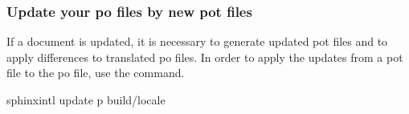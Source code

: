\documentclass[letterpaper,10pt,english]{sphinxmanual}
\begin{document}
\subsubsection{Update your po files by new pot files}
\label{\detokenize{usage/advanced/intl:update-your-po-files-by-new-pot-files}}
If a document is updated, it is necessary to generate updated pot files and to
apply differences to translated po files.  In order to apply the updates from a
pot file to the po file, use the  command.

\begin{sphinxVerbatim}[commandchars=\\\{\}]
 sphinx\PYGZhy{}intl update \PYGZhy{}p \PYGZus{}build/locale
\end{sphinxVerbatim}
\end{document}
